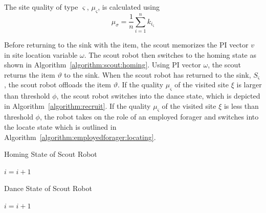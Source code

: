The site quality of type $\varsigma$, $\mu_\varsigma$, is calculated using
\begin{equation}
\label{density}
\mu_\sigma = \frac{1}{n}\sum\limits_{i=1}^n k_{i_\varsigma}
\end{equation}
 
Before returning to the sink with the item, the scout memorizes the PI vector $v$ in site location variable $\omega$. The scout robot then switches to the homing state as shown in Algorithm~\ref{algorithm:scout:homing}. Using PI vector $\omega$, the scout returns the item $\vartheta$ to the sink. When the scout robot has returned to the sink, $S_\varsigma$, the scout robot offloads the item $\vartheta$. If the quality $\mu_\varsigma$ of the visited site $\xi$ is larger than threshold $\phi$, the scout robot switches into the dance state, which is depicted in Algorithm~\ref{algorithm:recruit}. If the quality $\mu_\varsigma$ of the visited site $\xi$ is less than threshold $\phi$, the robot takes on the role of an employed forager and switches into the locate state which is outlined in Algorithm~\ref{algorithm:employedforager:locating}.


\begin{algorithm}
\caption{Homing State of Scout Robot}
\label{algorithm:scout:homing}
\begin{algorithmic}[1]
	\State {}
		\State {}
	\Else 
		\State {}
		\State {}
	\EndIf
\Else
		\State {}
	\EndIf
\EndIf
\State $i =i + 1$
\EndFunction
\end{algorithmic}
\end{algorithm}


\begin{algorithm}
\caption{Dance State of Scout Robot}
\label{algorithm:recruit}
\begin{algorithmic}[1]
	\State {} 
\Else 
	\State {}
	\If {$\varrho < \rho$} 
	\Else
	\EndIf
\EndIf
\State $i =i + 1$
\EndFunction
\end{algorithmic}
\end{algorithm}

